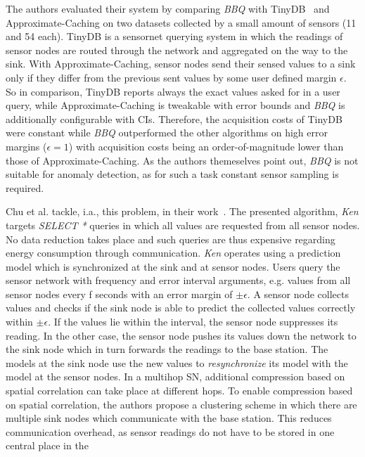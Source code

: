 The authors evaluated their system by comparing \textit{BBQ} with
TinyDB~\cite{madden2005tinydb} and Approximate-Caching on two datasets
collected by a small amount of sensors (11 and 54 each). TinyDB is a sensornet
querying system in which the readings of sensor nodes are routed through the
network and aggregated on the way to the sink. With Approximate-Caching, sensor
nodes send their sensed values to a sink only if they differ from the previous
sent values by some user defined margin $ \epsilon $. So in comparison, TinyDB
reports always the exact values asked for in a user query, while
Approximate-Caching is tweakable with error bounds and \textit{BBQ} is
additionally configurable with \acp{CI}. Therefore, the acquisition costs of
TinyDB were constant while \textit{BBQ} outperformed the other algorithms on
high error margins ($ \epsilon = 1 $) with acquisition costs being an
order-of-magnitude lower than those of Approximate-Caching. As the authors
themeselves point out, \textit{BBQ} is not suitable for anomaly detection, as
for such a task constant sensor sampling is required.
\par
Chu et al. tackle, i.a., this problem, in their work~\cite{chu2006approximate}.
The presented algorithm, \textit{Ken} targets \textit{SELECT *} queries in
which all values are requested from all sensor nodes. No data reduction takes
place and such queries are thus expensive regarding energy consumption through
communication. \textit{Ken} operates using a prediction model which is
synchronized at the sink and at sensor nodes. Users query the sensor network
with frequency and error interval arguments, e.g. values from all sensor nodes
every f seconds with an error margin of $ \pm\epsilon $. A sensor node collects
values and checks if the sink node is able to predict the collected values
correctly within $ \pm\epsilon $. If the values lie within the interval, the
sensor node suppresses its reading. In the other case, the sensor node pushes
its values down the network to the sink node which in turn forwards the
readings to the base station. The models at the sink node use the new values to
\textit{resynchronize} its model with the model at the sensor nodes. In a
multihop \ac{SN}, additional compression based on spatial correlation can take
place at different hops. To enable compression based on spatial correlation,
the authors propose a clustering scheme in which there are multiple sink nodes
which communicate with the base station. This reduces communication overhead,
as sensor readings do not have to be stored in one central place in the

